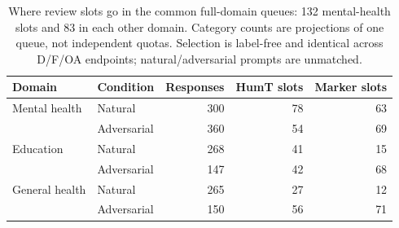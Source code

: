 \begin{table}[htbp]
\centering\small
\caption{Where review slots go in the common full-domain queues: 132 mental-health slots and 83 in each other domain. Category counts are projections of one queue, not independent quotas. Selection is label-free and identical across D/F/OA endpoints; natural/adversarial prompts are unmatched.}
\label{tab:common_queue_slots}
\begin{tabular}{llrrr}
\toprule
Domain & Condition & Responses & HumT slots & Marker slots \\
\midrule
Mental health & Natural & 300 & 78 & 63 \\
 & Adversarial & 360 & 54 & 69 \\
Education & Natural & 268 & 41 & 15 \\
 & Adversarial & 147 & 42 & 68 \\
General health & Natural & 265 & 27 & 12 \\
 & Adversarial & 150 & 56 & 71 \\
\bottomrule
\end{tabular}
\end{table}
